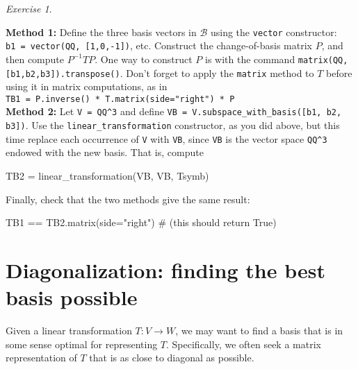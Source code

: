 \documentclass[fleqn,11pt]{paper}
\theoremstyle{remark}
\newtheorem{exercise}{Exercise}
\newcommand{\<}{\ensuremath{\langle}}
\renewcommand{\>}{\ensuremath{\rangle}}
\newcommand\sB{\ensuremath{\mathcal B}}
\begin{document}
\begin{exercise}
\begin{enumerate}[(a)]
  {\bf Method 1:} 
  Define the three basis vectors in $\sB$ using the \verb!vector! constructor:  \\
  \verb!b1 = vector(QQ, [1,0,-1])!, etc.
  Construct the change-of-basis matrix $P$, and then 
  compute $P^{-1} T P$. One way to construct $P$ is with the command
  \verb!matrix(QQ, [b1,b2,b3]).transpose()!.
  Don't forget to apply the \verb!matrix! method to $T$ before using it in matrix computations, as in\\
  \verb!TB1 = P.inverse() * T.matrix(side="right") * P!
  \\[5pt]
  {\bf Method 2:}
  Let \verb!V = QQ^3! and
  define \verb!VB = V.subspace_with_basis([b1, b2, b3])!.
  Use the \verb!linear_transformation! constructor, as you did above, but this time
  replace each occurrence of \verb!V!
  with \verb!VB!, since \verb!VB! is the vector space \verb!QQ^3! endowed with the new basis.
  That is, compute 
  \begin{sageblock}
   TB2 = linear_transformation(VB, VB, Tsymb)
  \end{sageblock}
  Finally, check that the two methods give the same result:
  \begin{sageblock}
    TB1 == TB2.matrix(side="right")      # (this should return True)
  \end{sageblock}

  
  \end{enumerate}
\end{exercise}

\section{Diagonalization: finding the best basis possible}
Given a linear transformation $T: V \to W$, we may want to find a basis that is 
in some sense optimal for representing $T$. Specifically, we often  seek a matrix
representation of $T$ that is as close to diagonal as possible.
\end{document}
